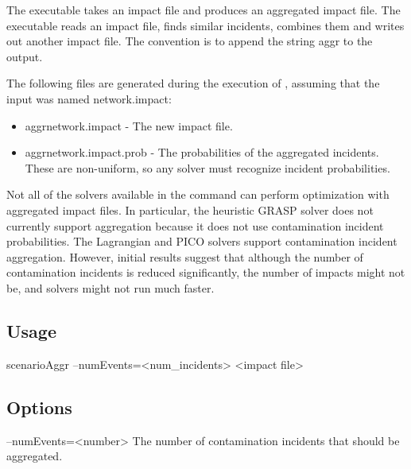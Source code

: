 The  executable takes an impact file and produces an 
aggregated impact file. The  executable reads an impact file, finds similar 
incidents, combines them and writes out another impact file. The convention is 
to append the string aggr to the output.

The following files are generated during the execution of , 
assuming that the input was named network.impact: 
\begin{itemize}
\item aggrnetwork.impact -\/ The new impact file. 
\item aggrnetwork.impact.prob -\/ The probabilities of the aggregated incidents. 
These are non-\/uniform, so any solver must recognize incident probabilities.
\end{itemize}

Not all of the solvers available in the  command can perform optimization with 
aggregated impact files. In particular, the heuristic GRASP solver does not 
currently support aggregation because it does not use contamination incident probabilities. 
The Lagrangian and PICO solvers support contamination incident aggregation. However, initial 
results suggest that although the number of contamination incidents is reduced significantly, 
the number of impacts might not be, and solvers might not run much faster. 

\subsection{Usage}\label{scenarioAggrExecutable_scenarioAggrUsage}
\begin{unknownListing}
   scenarioAggr --numEvents=<num_incidents> <impact file>
\end{unknownListing}

\subsection{Options}\label{scenarioAggrExecutable_scenarioAggrOptions}
\begin{unknownListing}
    --numEvents=<number>
    The number of contamination incidents that should be aggregated.
\end{unknownListing}

